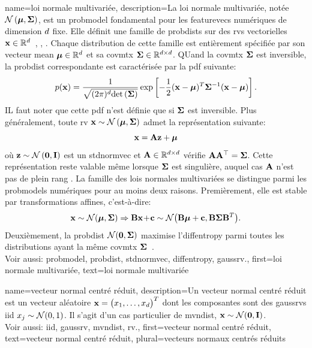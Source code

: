 {name={loi normale multivariée}, 
	description={La loi normale multivariée, 
		notée $\mathcal{N}\left({\bm \mu},{\bf \Sigma}\right)$, est un \gls{probmodel} fondamental 
		pour les \glspl{featurevec} numériques de dimension $d$ fixe. 
		Elle définit une famille de \glspl{probdist} sur des \glspl{rv} vectorielles 
		${\bf x} \in \mathbb{R}^{d}$~\cite{BertsekasProb}, \cite{GrayProbBook}, \cite{Lapidoth09}. 
		Chaque distribution de cette famille est entièrement spécifiée par son vecteur 
		\gls{mean} ${\bm \mu} \in \mathbb{R}^{d}$ et sa 
		\gls{covmtx} ${\bf \Sigma} \in \mathbb{R}^{d \times d}$. 
		QUand la \gls{covmtx} ${\bf \Sigma}$ est inversible, la \gls{probdist} correspondante est caractérisée 
		par la \gls{pdf} suivante:
		\[
		p({\bf x}) = 
		\frac{1}{\sqrt{(2\pi)^{d} {\rm det}\left( {\bf \Sigma} \right)}} 
		\exp\left[ -\frac{1}{2} 
		({\bf x} - {\bm \mu})^T {\bf \Sigma}^{-1} 
		({\bf x} - {\bm \mu}) \right].
		\]
		IL faut noter que cette \gls{pdf} n’est définie que si ${\bf \Sigma}$ est inversible.
		Plus généralement, toute \gls{rv} ${\bf x} \sim \mathcal{N}\left({\bm \mu},{\bf \Sigma}\right)$ 
		admet la représentation suivante:
		\[
		{\bf x} = {\bf A} {\bf z} + {\bm \mu}
		\]
		où ${\bf z} \sim \mathcal{N}\left(\mathbf{0},\mathbf{I}\right)$ est un \gls{stdnormvec} 
		et ${\bf A} \in \mathbb{R}^{d \times d}$ vérifie ${\bf A} {\bf A}^\top = {\bf \Sigma}$. 
		Cette représentation reste valable même lorsque ${\bf \Sigma}$ est singulière, 
		auquel cas ${\bf A}$ n’est pas de plein rang \cite[Ch. 23]{Lapidoth2017}.
		La famille des lois normales multivariées se distingue parmi les \glspl{probmodel} 
		numériques pour au moins deux raisons. 
		Premièrement, elle est stable par transformations affines, c’est-à-dire:
		\[ 
		{\bf x} \sim \mathcal{N}({\bm \mu},{\bf \Sigma}) \Rightarrow 
		{\bf B}{\bf x}\!+\!{\bf c} \sim \mathcal{N}\big( {\bf B}{\bm \mu}+{\bf c},{\bf B} {\bf \Sigma} {\bf B}^{T} \big). 
		\]
		Deuxièmement, la \gls{probdist} $\mathcal{N}(\mathbf{0},{\bf \Sigma})$ maximise 
		l’\gls{diffentropy} parmi toutes les distributions ayant la même \gls{covmtx} 
		${\bf \Sigma}$~\cite{coverthomas}. 
		\\
		Voir aussi: \gls{probmodel}, \gls{probdist}, \gls{stdnormvec}, \gls{diffentropy}, \gls{gaussrv}.}, 
	first={loi normale multivariée},
	text={loi normale multivariée}
}

{name={vecteur normal centré réduit}, 
	description={Un vecteur normal centré réduit est un vecteur aléatoire ${\bf x}=\big(x_{1}, \ldots, x_{d}\big)^{T}$ 
		dont les composantes sont des \glspl{gaussrv} \gls{iid} $x_{j} \sim \mathcal{N}(0,1)$. 
		Il s’agit d’un cas particulier de \gls{mvndist}, ${\bf x} \sim \mathcal{N}(\mathbf{0},\mathbf{I})$.
		\\ 
		Voir aussi: \gls{iid}, \gls{gaussrv}, \gls{mvndist}, \gls{rv}.}, 
	first={vecteur normal centré réduit},
	text={vecteur normal centré réduit}, plural={vecteurs normaux centrés réduits}
}

